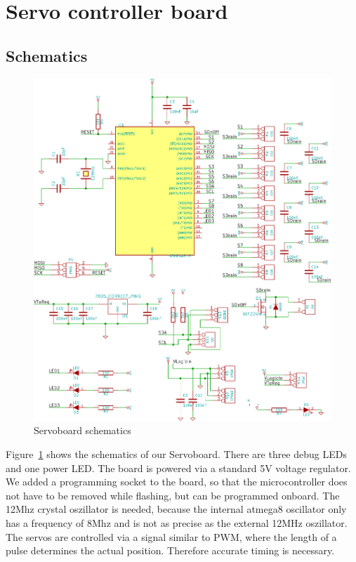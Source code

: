 \documentclass[a4paper
               ,10pt
               ,DIV=10 %
               ,BCOR=0.3cm
               ,pagesize %
               ,headings=small
               ,bibtotoc
               ]
               {scrartcl}
\begin{document}
\section{Servo controller board}
\subsection{Schematics}

\begin{figure}[H]
\begin{center}
\includegraphics[width=\linewidth]{pic/servoboard}
\caption{Servoboard schematics}
\label{figservoboardscm}
\end{center}
\end{figure}

Figure~\ref{figservoboardscm} shows the schematics of our Servoboard.
There are three debug LEDs and one power LED.
The board is powered via a standard 5V voltage regulator.
We added a programming socket to the board, so that the microcontroller does not have to be removed while flashing, but can be programmed onboard.
The 12Mhz crystal oszillator is needed, because the internal atmega8 oscillator only has a frequency of 8Mhz and is not as precise as the external 12MHz oszillator.
The servos are controlled via a signal similar to PWM, where the length of a pulse determines the actual position.
Therefore accurate timing is necessary.
\end{document}
